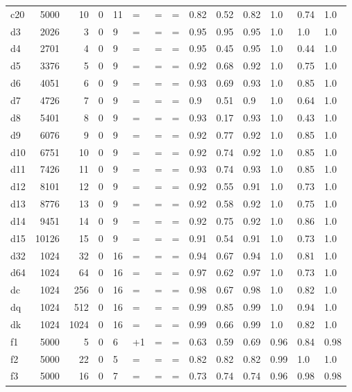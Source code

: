 \begin{tabular}{lrrrllllllllll}
c20 & 5000 & 10 & 0 & 11 & = & = & = & 0.82 & 0.52 & 0.82 & 1.0 & 0.74 & 1.0 \\
d3 & 2026 & 3 & 0 & 9 & = & = & = & 0.95 & 0.95 & 0.95 & 1.0 & 1.0 & 1.0 \\
d4 & 2701 & 4 & 0 & 9 & = & = & = & 0.95 & 0.45 & 0.95 & 1.0 & 0.44 & 1.0 \\
d5 & 3376 & 5 & 0 & 9 & = & = & = & 0.92 & 0.68 & 0.92 & 1.0 & 0.75 & 1.0 \\
d6 & 4051 & 6 & 0 & 9 & = & = & = & 0.93 & 0.69 & 0.93 & 1.0 & 0.85 & 1.0 \\
d7 & 4726 & 7 & 0 & 9 & = & = & = & 0.9 & 0.51 & 0.9 & 1.0 & 0.64 & 1.0 \\
d8 & 5401 & 8 & 0 & 9 & = & = & = & 0.93 & 0.17 & 0.93 & 1.0 & 0.43 & 1.0 \\
d9 & 6076 & 9 & 0 & 9 & = & = & = & 0.92 & 0.77 & 0.92 & 1.0 & 0.85 & 1.0 \\
d10 & 6751 & 10 & 0 & 9 & = & = & = & 0.92 & 0.74 & 0.92 & 1.0 & 0.85 & 1.0 \\
d11 & 7426 & 11 & 0 & 9 & = & = & = & 0.93 & 0.74 & 0.93 & 1.0 & 0.85 & 1.0 \\
d12 & 8101 & 12 & 0 & 9 & = & = & = & 0.92 & 0.55 & 0.91 & 1.0 & 0.73 & 1.0 \\
d13 & 8776 & 13 & 0 & 9 & = & = & = & 0.92 & 0.58 & 0.92 & 1.0 & 0.75 & 1.0 \\
d14 & 9451 & 14 & 0 & 9 & = & = & = & 0.92 & 0.75 & 0.92 & 1.0 & 0.86 & 1.0 \\
d15 & 10126 & 15 & 0 & 9 & = & = & = & 0.91 & 0.54 & 0.91 & 1.0 & 0.73 & 1.0 \\
d32 & 1024 & 32 & 0 & 16 & = & = & = & 0.94 & 0.67 & 0.94 & 1.0 & 0.81 & 1.0 \\
d64 & 1024 & 64 & 0 & 16 & = & = & = & 0.97 & 0.62 & 0.97 & 1.0 & 0.73 & 1.0 \\
dc & 1024 & 256 & 0 & 16 & = & = & = & 0.98 & 0.67 & 0.98 & 1.0 & 0.82 & 1.0 \\
dq & 1024 & 512 & 0 & 16 & = & = & = & 0.99 & 0.85 & 0.99 & 1.0 & 0.94 & 1.0 \\
dk & 1024 & 1024 & 0 & 16 & = & = & = & 0.99 & 0.66 & 0.99 & 1.0 & 0.82 & 1.0 \\
f1 & 5000 & 5 & 0 & 6 & +1 & = & = & 0.63 & 0.59 & 0.69 & 0.96 & 0.84 & 0.98 \\
f2 & 5000 & 22 & 0 & 5 & = & = & = & 0.82 & 0.82 & 0.82 & 0.99 & 1.0 & 1.0 \\
f3 & 5000 & 16 & 0 & 7 & = & = & = & 0.73 & 0.74 & 0.74 & 0.96 & 0.98 & 0.98 \\

\end{tabular}

